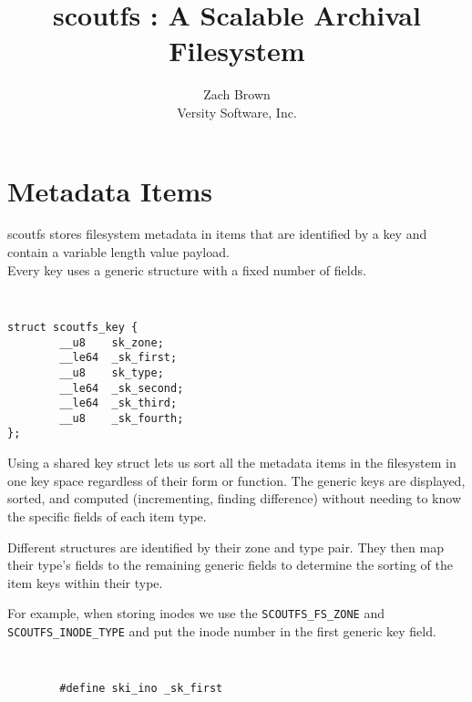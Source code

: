 \documentclass[letterpaper,twocolumn,10pt]{article}
\begin{document}
\date{}

\title{\Large \bf scoutfs : A Scalable Archival Filesystem}

\author{
{\rm Zach Brown}\\
Versity Software, Inc.
}

\maketitle


\section{Metadata Items}

scoutfs stores filesystem metadata in items that are identified by a
key and contain a variable length value payload.\\

Every key uses a generic structure with a fixed number of fields.

{\tt \small
\begin{verbatim}
struct scoutfs_key {
        __u8    sk_zone;
        __le64  _sk_first;
        __u8    sk_type;
        __le64  _sk_second;
        __le64  _sk_third;
        __u8    _sk_fourth;
};
\end{verbatim}
}

Using a shared key struct lets us sort all the metadata items in the
filesystem in one key space regardless of their form or function.  The
generic keys are displayed, sorted, and computed (incrementing, finding
difference) without needing to know the specific fields of each item
type.

Different structures are identified by their zone and type pair.  They
then map their type's fields to the remaining generic fields to
determine the sorting of the item keys within their type.

For example, when storing inodes we use the {\tt SCOUTFS\_FS\_ZONE} and
{\tt SCOUTFS\_INODE\_TYPE} and put the inode number in the first generic
key field.

{\tt \small
\begin{verbatim}
        #define ski_ino _sk_first
\end{verbatim}
}
\end{document}

